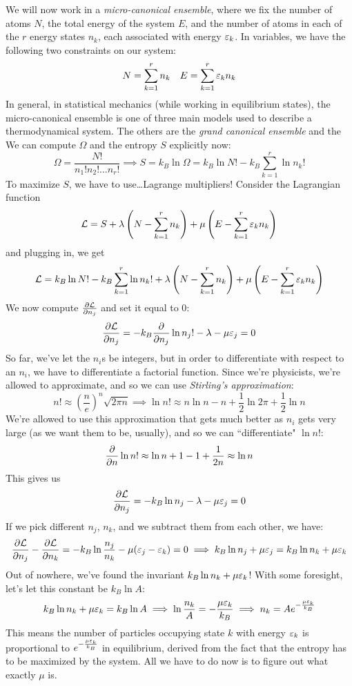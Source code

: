 We will now work in a \textit{micro-canonical ensemble}, where we fix the number of atoms $N$, the total energy of the system $E$, and the number of atoms in each of the $r$ energy states $n_k$, each associated with energy $\varepsilon_k$. In variables, we have the following two constraints on our system: 
\[
	N = \sum_{k=1}^r n_k \quad E = \sum_{k=1}^r \varepsilon_k n_k
\]
In general, in statistical mechanics (while working in equilibrium states), the micro-canonical ensemble is one of three main models used to describe a thermodynamical system. The others are the \textit{grand canonical ensemble} and the \textit{}
We can compute $\Omega$ and the entropy $S$ explicitly now: 
\[
	\Omega = \frac{N!}{n_1! n_2! \ldots n_r!} \implies S = k_B \ln \Omega = k_B \ln N! - k_B \sum_{k=1}^r \ln n_k!
\]
To maximize $S$, we have to use\ldots Lagrange multipliers! Consider the Lagrangian function
\[
	\mathcal{L} = S + \lambda\left(N - \sum_{k=1}^r n_k \right) + \mu \left(E - \sum_{k=1}^r \varepsilon_k n_k\right) 
\]
and plugging in, we get 
\[
	\mathcal{L} = k_B \ln N! - k_B \sum_{k=1}^r \ln n_k! + \lambda\left(N - \sum_{k=1}^r n_k \right) + \mu \left(E - \sum_{k=1}^r \varepsilon_k n_k\right) 
\]
We now compute $\frac{\partial \mathcal{L}}{\partial n_j}$ and set it equal to 0: 
\[
	\frac{\partial \mathcal{L}}{\partial n_j} = -k_B \frac{\partial }{\partial n_j} \ln n_j! - \lambda - \mu \varepsilon_j = 0
\]
So far, we've let the $n_i$s be integers, but in order to differentiate with respect to an $n_i$, we have to differentiate a factorial function. Since we're physicists, we're allowed to approximate, and so we can use \textit{Stirling's approximation}: 
\[
	n! \approx \left(\frac{n}{e}\right)^n \sqrt{2 \pi n} \implies \ln n! \approx n \ln n - n + \frac{1}{2} \ln 2\pi + \frac{1}{2} \ln n
\]
We're allowed to use this approximation that gets much better as $n_i$ gets very large (as we want them to be, usually), and so we can ``differentiate" $\ln n!$: 
\[
	\frac{\partial }{\partial n} \ln n! \approx \ln n + 1 - 1 + \frac{1}{2n} \approx \ln n
\]
This gives us 
\[
	\frac{\partial \mathcal{L}}{\partial n_j} = -k_B \ln n_j - \lambda - \mu \varepsilon_j = 0
\]
If we pick different $n_j$, $n_k$, and we subtract them from each other, we have: 
\[
	\frac{\partial \mathcal{L}}{\partial n_j} - \frac{\partial \mathcal{L}}{\partial n_k} = -k_B \ln \frac{n_j}{n_k} - \mu (\varepsilon_j - \varepsilon_k) = 0 \implies k_B \ln n_j + \mu \varepsilon_j = k_B \ln n_k + \mu \varepsilon_k 
\]
Out of nowhere, we've found the invariant $k_B \ln n_k + \mu \varepsilon_k$! With some foresight, let's let this constant be $k_B \ln A$: 
\[
	 k_B \ln n_k + \mu \varepsilon_k = k_B \ln A \implies \ln \frac{n_k}{A} = -\frac{\mu \varepsilon_k}{k_B} \implies n_k = A e^{-\frac{\mu \varepsilon_k}{k_B}}
\]
This means the number of particles occupying state $k$ with energy $\varepsilon_k$ is proportional to $e^{-\frac{\mu \varepsilon_k}{k_B}}$ in equilibrium, derived from the fact that the entropy has to be maximized by the system. All we have to do now is to figure out what exactly $\mu$ is. 


